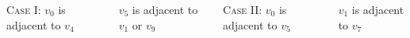 \begin{frame}{}
  \begin{columns}
      \begin{center}
        \textsc{Case I:} $v_{0}$ is adjacent to $v_{4}$
      \end{center}

      \pause
      \begin{center}
        $v_{5}$ is adjacent to $v_{1}$ or $v_{9}$

        \pause
        \vspace{0.30cm}
      \end{center}
      \pause
      \begin{center}
        \textsc{Case II:} $v_{0}$ is adjacent to $v_{5}$
      \end{center}

      \pause
      \begin{center}
        $v_{1}$ is adjacent to $v_{7}$

        \pause
        \vspace{0.30cm}
      \end{center}
  \end{columns}
\end{frame}
